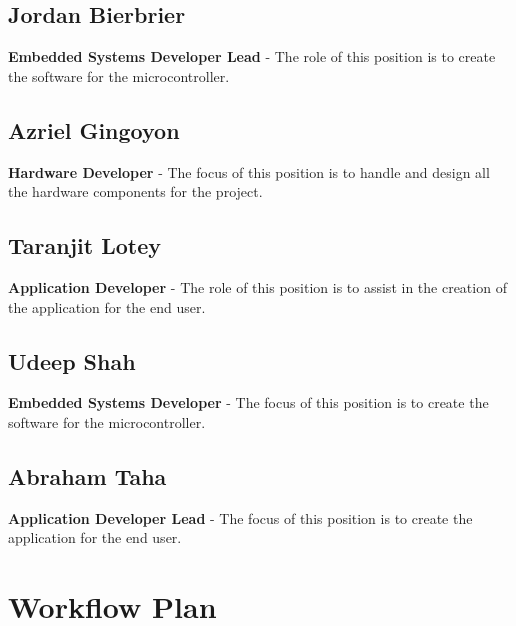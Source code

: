 \documentclass[12pt, titlepage]{article}
\begin{document}
\subsection*{Jordan Bierbrier}
\textbf{Embedded Systems Developer Lead} - The role of this position is to create the software for the microcontroller.

\subsection*{Azriel Gingoyon}
\textbf{Hardware Developer} - The focus of this position is to handle and design all the hardware components for the project.

\subsection*{Taranjit Lotey}
\textbf{Application Developer} - The role of this position is to assist in the creation of the application for the end user.
                                
\subsection*{Udeep Shah}
\textbf{Embedded Systems Developer} - The focus of this position is to create the software for the microcontroller.

\subsection*{Abraham Taha}
\textbf{Application Developer Lead} - The focus of this position is to create the application for the end user.


\section{Workflow Plan}
\end{document}
